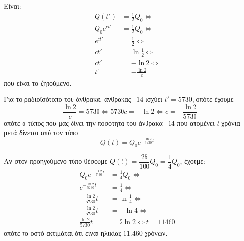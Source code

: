 \begin{alist}
\item Είναι:
\begin{align*}
Q(t') &= \frac{1}{2}Q_0 \Leftrightarrow \\
Q_0 e^{ct'} &= \frac{1}{2}Q_0 \Leftrightarrow \\
e^{ct'} &= \frac{1}{2} \Leftrightarrow \\
ct' &= \ln\frac{1}{2} \Leftrightarrow \\
ct' &= -\ln 2 \Leftrightarrow \\
t' &= -\frac{\ln 2}{c}
\end{align*}
που είναι το ζητούμενο.
\item Για το ραδιοϊσότοπο του άνθρακα, άνθρακας$-14$ ισχύει $t' = 5730$, οπότε έχουμε
\[-\frac{\ln 2}{c} = 5730 \Leftrightarrow 5730c = -\ln 2 \Leftrightarrow c = -\frac{\ln 2}{5730}\]
οπότε ο τύπος που μας δίνει την ποσότητα του άνθρακα$-14$ που απομένει $t$ χρόνια μετά δίνεται από τον τύπο
\[Q(t) = Q_0 e^{-\frac{\ln 2}{5730}t}\]
\item Αν στον προηγούμενο τύπο θέσουμε $Q(t) = \dfrac{25}{100}Q_0 = \dfrac{1}{4}Q_0$, έχουμε:
\begin{align*}
Q_0 e^{-\frac{\ln 2}{5730}t} &= \frac{1}{4}Q_0 \Leftrightarrow \\
e^{-\frac{\ln 2}{5730}t} &= \frac{1}{4} \Leftrightarrow \\
-\frac{\ln 2}{5730}t &= \ln\frac{1}{4} \Leftrightarrow \\
-\frac{\ln 2}{5730}t &= -\ln 4 \Leftrightarrow \\
\frac{\ln 2}{5730}t &= 2\ln 2 \Leftrightarrow t = 11460
\end{align*}
οπότε το οστό εκτιμάται ότι είναι ηλικίας $11.460$ χρόνων.
\end{alist}

